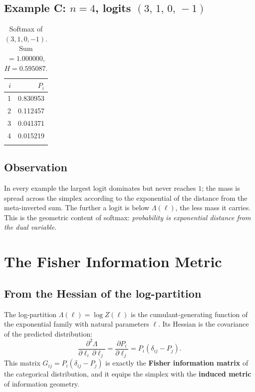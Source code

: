 \documentclass[11pt]{article}
\begin{document}
\subsection{Example C: $n=4$, logits $(3,\,1,\,0,\,-1)$}
\label{sec:worked-c}

\begin{longtable}{@{}rr@{}}
\toprule
$i$ & $P_i$ \\
\midrule
1 & 0.830953 \\
2 & 0.112457 \\
3 & 0.041371 \\
4 & 0.015219 \\
\bottomrule
\caption{Softmax of $(3,1,0,-1)$. Sum $=1.000000$, $H=0.595087$.}
\label{tab:worked-c}
\end{longtable}

\subsection{Observation}
\label{sec:worked-obs}

In every example the largest logit dominates but never reaches $1$; the mass is
spread across the simplex according to the exponential of the distance from the
meta-inverted sum. The further a logit is below $\Lambda(\ell)$, the less mass
it carries. This is the geometric content of softmax: \emph{probability is
exponential distance from the dual variable}.

\section{The Fisher Information Metric}
\label{sec:fisher}

\subsection{From the Hessian of the log-partition}
\label{sec:fisher-hess}

The log-partition $\Lambda(\ell)=\log Z(\ell)$ is the cumulant-generating
function of the exponential family with natural parameters $\ell$. Its Hessian
is the covariance of the predicted distribution:
\[
\frac{\partial^2 \Lambda}{\partial \ell_i\,\partial \ell_j}
= \frac{\partial P_i}{\partial \ell_j}
= P_i(\delta_{ij} - P_j).
\]
This matrix $G_{ij} = P_i(\delta_{ij}-P_j)$ is exactly the \textbf{Fisher
information matrix} of the categorical distribution, and it equips the simplex
with the \textbf{induced metric} of information geometry.
\end{document}

